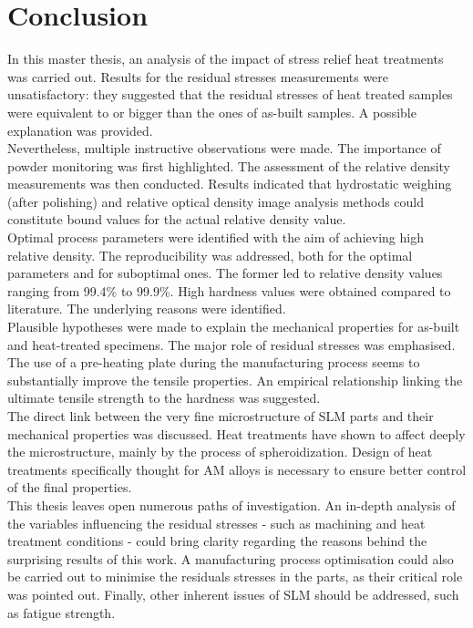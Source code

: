 \chapter{Conclusion}
\label{Chap6}
In this master thesis, an analysis of the impact of stress relief heat treatments was carried out. Results for the residual stresses measurements were unsatisfactory: they suggested that the residual stresses of heat treated samples were equivalent to or bigger than the ones of as-built samples. A possible explanation was provided.\\

Nevertheless, multiple instructive observations were made. The importance of powder monitoring was first highlighted. The assessment of the relative density measurements was then conducted. Results indicated that hydrostatic weighing (after polishing) and relative optical density image analysis methods could constitute bound values for the actual relative density value.\\

Optimal process parameters were identified with the aim of achieving high relative density. The reproducibility was addressed, both for the optimal parameters and for suboptimal ones. The former led to relative density values ranging from 99.4\% to 99.9\%. High hardness values were obtained compared to literature. The underlying reasons were identified.\\

Plausible hypotheses were made to explain the mechanical properties for as-built and heat-treated specimens. The major role of residual stresses was emphasised. The use of a pre-heating plate during the manufacturing process seems to substantially improve the tensile properties. An empirical relationship linking the ultimate tensile strength to the hardness was suggested.\\

The direct link between the very fine microstructure of SLM parts and their mechanical properties was discussed. Heat treatments have shown to affect deeply the microstructure, mainly by the process of spheroidization. Design of heat treatments specifically thought for AM alloys is necessary to ensure better control of the final properties.\\

This thesis leaves open numerous paths of investigation. An in-depth analysis of the variables influencing the residual stresses - such as machining and heat treatment conditions - could bring clarity regarding the reasons behind the surprising results of this work. A manufacturing process optimisation could also be carried out to minimise the residuals stresses in the parts, as their critical role was pointed out. Finally, other inherent issues of SLM should be addressed, such as fatigue strength.\\


%